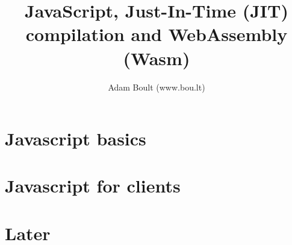 \documentclass[oneside]{book}
\begin{document}
\author{Adam Boult (www.bou.lt)}
\title{JavaScript, Just-In-Time (JIT) compilation and WebAssembly (Wasm)}
\maketitle

\setcounter{tocdepth}{0}
\tableofcontents



\part{Javascript basics}







\part{Javascript for clients}




\part{Later}

\end{document}
